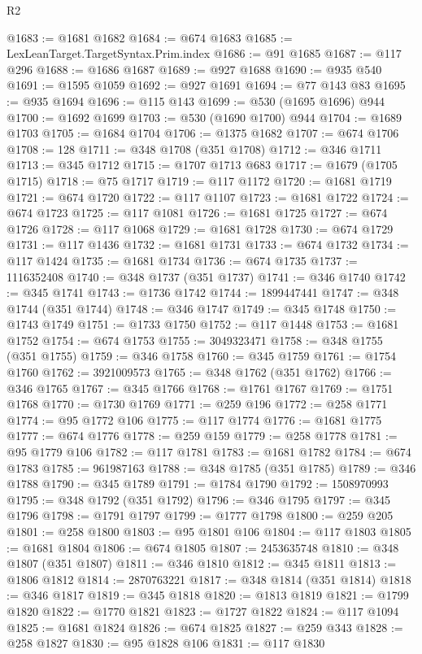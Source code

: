 \begin{lexlean}{R2}
\begin{coremodule}
@1683 := @1681 @1682
@1684 := @674 @1683
@1685 := LexLeanTarget.TargetSyntax.Prim.index
@1686 := @91 @1685
@1687 := @117 @296
@1688 := @1686 @1687
@1689 := @927 @1688
@1690 := @935 @540
@1691 := @1595 @1059
@1692 := @927 @1691
@1694 := @77 @143 @83
@1695 := @935 @1694
@1696 := @115 @143
@1699 := @530 (@1695 @1696) @944
@1700 := @1692 @1699
@1703 := @530 (@1690 @1700) @944
@1704 := @1689 @1703
@1705 := @1684 @1704
@1706 := @1375 @1682
@1707 := @674 @1706
@1708 := 128
@1711 := @348 @1708 (@351 @1708)
@1712 := @346 @1711
@1713 := @345 @1712
@1715 := @1707 @1713 @683
@1717 := @1679 (@1705 @1715)
@1718 := @75 @1717
@1719 := @117 @1172
@1720 := @1681 @1719
@1721 := @674 @1720
@1722 := @117 @1107
@1723 := @1681 @1722
@1724 := @674 @1723
@1725 := @117 @1081
@1726 := @1681 @1725
@1727 := @674 @1726
@1728 := @117 @1068
@1729 := @1681 @1728
@1730 := @674 @1729
@1731 := @117 @1436
@1732 := @1681 @1731
@1733 := @674 @1732
@1734 := @117 @1424
@1735 := @1681 @1734
@1736 := @674 @1735
@1737 := 1116352408
@1740 := @348 @1737 (@351 @1737)
@1741 := @346 @1740
@1742 := @345 @1741
@1743 := @1736 @1742
@1744 := 1899447441
@1747 := @348 @1744 (@351 @1744)
@1748 := @346 @1747
@1749 := @345 @1748
@1750 := @1743 @1749
@1751 := @1733 @1750
@1752 := @117 @1448
@1753 := @1681 @1752
@1754 := @674 @1753
@1755 := 3049323471
@1758 := @348 @1755 (@351 @1755)
@1759 := @346 @1758
@1760 := @345 @1759
@1761 := @1754 @1760
@1762 := 3921009573
@1765 := @348 @1762 (@351 @1762)
@1766 := @346 @1765
@1767 := @345 @1766
@1768 := @1761 @1767
@1769 := @1751 @1768
@1770 := @1730 @1769
@1771 := @259 @196
@1772 := @258 @1771
@1774 := @95 @1772 @106
@1775 := @117 @1774
@1776 := @1681 @1775
@1777 := @674 @1776
@1778 := @259 @159
@1779 := @258 @1778
@1781 := @95 @1779 @106
@1782 := @117 @1781
@1783 := @1681 @1782
@1784 := @674 @1783
@1785 := 961987163
@1788 := @348 @1785 (@351 @1785)
@1789 := @346 @1788
@1790 := @345 @1789
@1791 := @1784 @1790
@1792 := 1508970993
@1795 := @348 @1792 (@351 @1792)
@1796 := @346 @1795
@1797 := @345 @1796
@1798 := @1791 @1797
@1799 := @1777 @1798
@1800 := @259 @205
@1801 := @258 @1800
@1803 := @95 @1801 @106
@1804 := @117 @1803
@1805 := @1681 @1804
@1806 := @674 @1805
@1807 := 2453635748
@1810 := @348 @1807 (@351 @1807)
@1811 := @346 @1810
@1812 := @345 @1811
@1813 := @1806 @1812
@1814 := 2870763221
@1817 := @348 @1814 (@351 @1814)
@1818 := @346 @1817
@1819 := @345 @1818
@1820 := @1813 @1819
@1821 := @1799 @1820
@1822 := @1770 @1821
@1823 := @1727 @1822
@1824 := @117 @1094
@1825 := @1681 @1824
@1826 := @674 @1825
@1827 := @259 @343
@1828 := @258 @1827
@1830 := @95 @1828 @106
@1831 := @117 @1830

\end{coremodule}
\end{lexlean}
